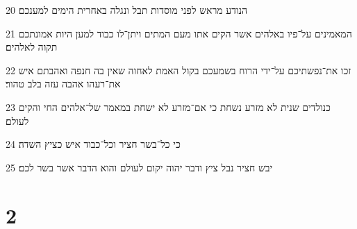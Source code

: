 \par 20 הנודע מראש לפני מוסדות תבל ונגלה באחרית הימים למענכם׃
\par 21 המאמינים על־פיו באלהים אשר הקים אתו מעם המתים ויתן־לו כבוד למען היות אמונתכם תקוה לאלהים׃
\par 22 זכו את־נפשתיכם על־ידי הרוח בשמעכם בקול האמת לאחוה שאין בה חנפה ואהבתם איש את־רעהו אהבה עזה בלב טהור׃
\par 23 כנולדים שנית לא מזרע נשחת כי אם־מזרע לא ישחת במאמר של־אלהים החי והקים לעולם׃
\par 24 כי כל־בשר חציר וכל־כבוד איש כציץ השדה׃
\par 25 יבש חציר נבל ציץ ודבר יהוה יקום לעולם והוא הדבר אשר בשר לכם׃

\chapter{2}

